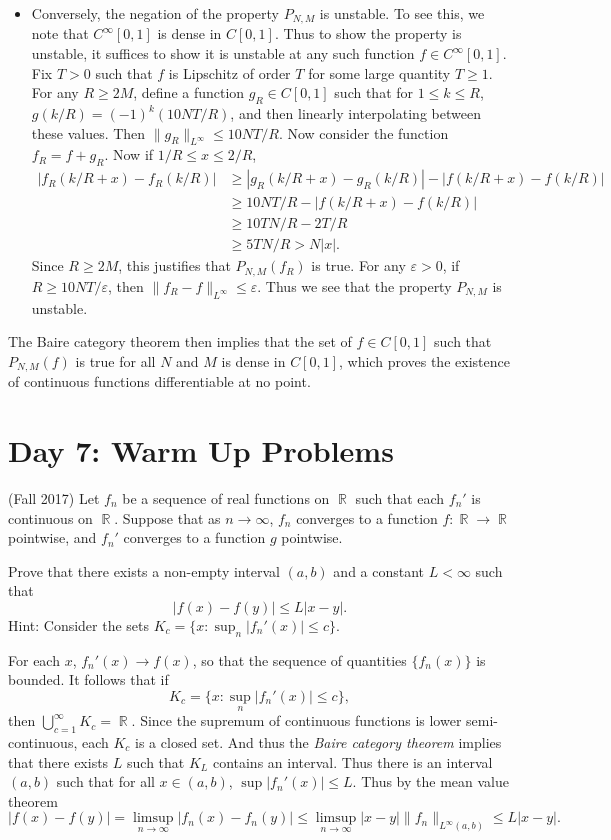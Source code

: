 \documentclass{exam}
\DeclareMathOperator{\RR}{\mathbb{R}}
\theoremstyle{problemstyle}
\newcommand{\1}[1]{\textbf{1}_{\left[#1\right]}} %
\begin{document}
\begin{questions}
\begin{itemize}
	\item Conversely, the negation of the property $P_{N,M}$ is unstable. To see this, we note that $C^\infty[0,1]$ is dense in $C[0,1]$. Thus to show the property is unstable, it suffices to show it is unstable at any such function $f \in C^\infty[0,1]$. Fix $T > 0$ such that $f$ is Lipschitz of order $T$ for some large quantity $T \geq 1$. For any $R \geq 2M$, define a function $g_R \in C[0,1]$ such that for $1 \leq k \leq R$, $g(k/R) = (-1)^k (10NT/R)$, and then linearly interpolating between these values. Then $\| g_R \|_{L^\infty} \leq 10NT/R$. Now consider the function $f_R = f + g_R$. Now if $1/R \leq x \leq 2/R$,
	\begin{align*}
		|f_R(k/R + x) - f_R(k/R)| &\geq |g_R(k/R + x) - g_R(k/R)| - |f(k/R + x) - f(k/R)|\\
		&\geq 10NT/R - |f(k/R + x) - f(k/R)|\\
		&\geq 10TN/R - 2T/R\\
		&\geq 5TN/R > N|x|.
	\end{align*}
	Since $R \geq 2M$, this justifies that $P_{N,M}(f_R)$ is true. For any $\varepsilon > 0$, if $R \geq 10NT/\varepsilon$, then $\| f_R - f \|_{L^\infty} \leq \varepsilon$. Thus we see that the property $P_{N,M}$ is unstable.
\end{itemize}
%
The Baire category theorem then implies that the set of $f \in C[0,1]$ such that $P_{N,M}(f)$ is true for all $N$ and $M$ is dense in $C[0,1]$, which proves the existence of continuous functions differentiable at no point.




\newpage
\section*{Day 7: Warm Up Problems}

\question (Fall 2017) Let $f_n$ be a sequence of real functions on $\RR$ such that each $f_n'$ is continuous on $\RR$. Suppose that as $n \to \infty$, $f_n$ converges to a function $f: \RR \to \RR$ pointwise, and $f_n'$ converges to a function $g$ pointwise.

Prove that there exists a non-empty interval $(a,b)$ and a constant $L < \infty$ such that
%
\[ |f(x) - f(y)| \leq L |x-y|. \]
%
Hint: Consider the sets $K_c = \{ x: \sup_n |f_n'(x)| \leq c \}$.
\begin{solution}
    For each $x$, $f_n'(x) \to f(x)$, so that the sequence of quantities $\{ f_n(x) \}$ is bounded. It follows that if
    \[ K_c = \{ x : \sup_n |f_n'(x)| \leq c \}, \]
    then $\bigcup_{c = 1}^\infty K_c = \RR$. Since the supremum of continuous functions is lower semi-continuous, each $K_c$ is a closed set. And thus the \emph{Baire category theorem} implies that there exists $L$ such that $K_L$ contains an interval. Thus there is an interval $(a,b)$ such that for all $x \in (a,b)$, $\sup |f_n'(x)| \leq L$. Thus by the mean value theorem
    \[ |f(x) - f(y)| = \limsup_{n \to \infty} |f_n(x) - f_n(y)| \leq \limsup_{n \to \infty} |x - y| \| f_n \|_{L^\infty(a,b)} \leq L |x - y|. \]
\end{solution}





\end{questions}
\end{document}
